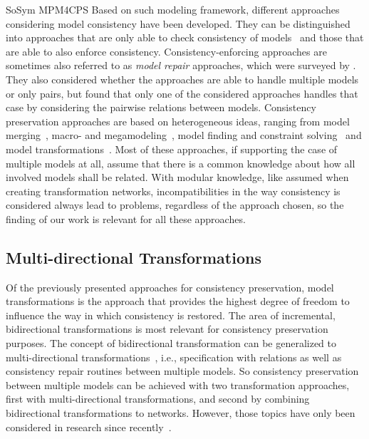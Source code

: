 \begin{copiedFrom}{SoSym MPM4CPS}
Based on such modeling framework, different approaches considering model consistency have been developed.
They can be distinguished into approaches that are only able to check consistency of models~\cite{reder2012incrementalchecking,koenig2017a} and those that are able to also enforce consistency.
Consistency-enforcing approaches are sometimes also referred to as \emph{model repair} approaches, which were surveyed by \textcite{macedo2017ModelRepairClassification-TSE}.
They also considered whether the approaches are able to handle multiple models or only pairs, but found that only one of the considered approaches handles that case by considering the pairwise relations between models.
Consistency preservation approaches are based on heterogeneous ideas, ranging from model merging~\cite{mansoor2015jss,rubin2013fse}, macro- and megamodeling~\cite{salay2008a,salay2015megamodelling}, model finding and constraint solving~\cite{macedo2013a,macedo2013b} and model transformations~\cite{czarnecki2006a, etzlstorfer2013SurveyIncrementalTransformation-ME, samimi-dehkordi2016iccke, macedo2017ModelRepairClassification-TSE}.
Most of these approaches, if supporting the case of multiple models at all, assume that there is a common knowledge about how all involved models shall be related.
With modular knowledge, like assumed when creating transformation networks, incompatibilities in the way consistency is considered always lead to problems, regardless of the approach chosen, so the finding of our work is relevant for all these approaches.


\subsection*{Multi-directional Transformations}

Of the previously presented approaches for consistency preservation, model transformations is the approach that provides the highest degree of freedom to influence the way in which consistency is restored.
The area of incremental, bidirectional transformations is most relevant for consistency preservation purposes.
The concept of bidirectional transformation can be generalized to multi-directional transformations~\cite{stevens2020BidirectionalTransformationLarge-SoSym, cleve2019dagstuhl}, i.e., specification with relations as well as consistency repair routines between multiple models.
So consistency preservation between multiple models can be achieved with two transformation approaches, first with multi-directional transformations, and second by combining bidirectional transformations to networks.
However, those topics have only been considered in research since recently~\cite{cleve2019dagstuhl}.


\end{copiedFrom}
